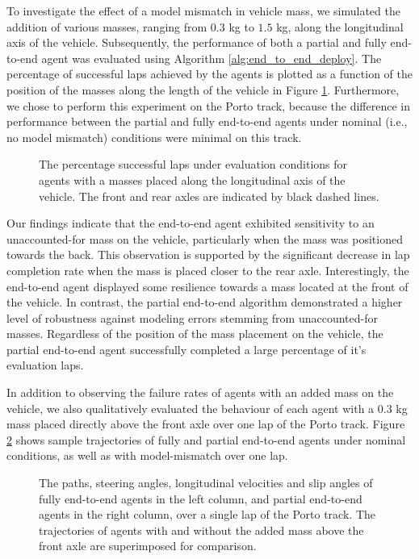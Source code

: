 To investigate the effect of a model mismatch in vehicle mass, we simulated the addition of various masses, ranging from $0.3$ kg to $1.5$ kg, along the longitudinal axis of the vehicle.
Subsequently, the performance of both a partial and fully end-to-end agent was evaluated using Algorithm \ref{alg:end_to_end_deploy}. 
The percentage of successful laps achieved by the agents is plotted as a function of the position of the masses along the length of the vehicle in Figure \ref{fig:unknown_mass}.
Furthermore, we chose to perform this experiment on the Porto track, because the difference in performance between the partial and fully end-to-end agents under nominal 
(i.e., no model mismatch) conditions were minimal on this track.

\begin{figure}[htb!]
    \centering
    
    \caption[Percentage successful laps under evaluation conditions for agents with masses placed along the longitudinal axis of the vehicle]{The percentage successful laps under evaluation conditions for agents with a masses placed along the longitudinal axis of the vehicle. The front and rear axles are indicated by black dashed lines.}
    \label{fig:unknown_mass}
\end{figure}

Our findings indicate that the end-to-end agent exhibited sensitivity to an unaccounted-for mass on the vehicle, particularly when the mass was positioned towards the back. 
This observation is supported by the significant decrease in lap completion rate when the mass is placed closer to the rear axle. 
Interestingly, the end-to-end agent displayed some resilience towards a mass located at the front of the vehicle. 
In contrast, the partial end-to-end algorithm demonstrated a higher level of robustness against modeling errors stemming from unaccounted-for masses. 
Regardless of the position of the mass placement on the vehicle, the partial end-to-end agent successfully completed a large percentage of it's evaluation laps.

In addition to observing the failure rates of agents with an added mass on the vehicle, we also qualitatively evaluated the behaviour of each agent with a $0.3$ kg mass placed directly above the front axle over one lap of the Porto track.
Figure \ref{fig:unknown_mass_trajs_2} shows sample trajectories of fully and partial end-to-end agents under nominal conditions, as well as with model-mismatch over one lap.

\begin{figure}[htb!]
    \centering
    
    \caption[Trajectories of agents racing with and without an accounted for mass placed above the front axle]{The paths, steering angles, longitudinal velocities and slip angles of fully end-to-end agents in the left column, and partial end-to-end agents in the right column, over a single lap of the Porto track. The trajectories of agents with and without the added mass above the front axle are superimposed for comparison.}
    \label{fig:unknown_mass_trajs_2}
\end{figure}


